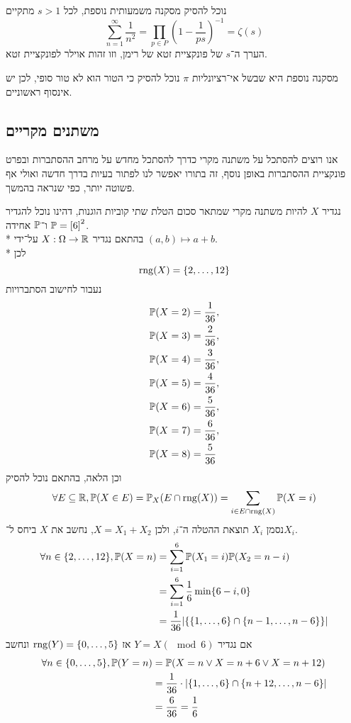 \begin{conclusion}
	נוכל להסיק מסקנה משמעותית נוספת, לכל $s > 1$ מתקיים
	\[
		\sum_{n = 1}^\infty \frac{1}{n^2} = \prod_{p \in P} {(1 - \frac{1}{ps})}^{-1} = \zeta(s)
	\]
	הערך ה־$s$ של פונקציית זטא של רימן, וזו זהות אוילר לפונקציית זטא.
\end{conclusion}
\begin{conclusion}
	מסקנה נוספת היא שבשל אי־רציונליות $\pi$ נוכל להסיק כי הטור הוא לא טור סופי, לכן יש אינסוף ראשוניים.
\end{conclusion}

\subsection{משתנים מקריים}
אנו רוצים להסתכל על משתנה מקרי כדרך להסתכל מחדש על מרחב ההסתברות ובפרט פונקציית ההסתברות באופן נוסף, זה בתורו יאפשר לנו לפתור בעיות בדרך חדשה ואולי אף פשוטה יותר, כפי שנראה בהמשך.
\begin{example}
	נגדיר $X$ להיות משתנה מקרי שמתאר סכום הטלת שתי קוביות הוגנות, דהינו נוכל להגדיר $\mathbb{P} = {[6]}^2$ ו־$\mathbb{P}$ אחידה. \\*
	בהתאם נגדיר $X : \Omega \to \mathbb{R}$ על־ידי $(a, b) \mapsto a + b$. \\*
	לכן
	\[
		\operatorname{rng}(X) = \{2, \dots, 12 \}
	\]
	נעבור לחישוב הסתברויות
	\begin{align*}
		& \mathbb{P}(X = 2) = \frac{1}{36}, \\
		& \mathbb{P}(X = 3) = \frac{2}{36}, \\
		& \mathbb{P}(X = 4) = \frac{3}{36}, \\
		& \mathbb{P}(X = 5) = \frac{4}{36}, \\
		& \mathbb{P}(X = 6) = \frac{5}{36}, \\
		& \mathbb{P}(X = 7) = \frac{6}{36}, \\
		& \mathbb{P}(X = 8) = \frac{5}{36}
	\end{align*}
	וכן הלאה, בהתאם נוכל להסיק
	\[
		\forall E \subseteq \mathbb{R},
		\mathbb{P}(X \in E)
		= \mathbb{P}_X(E \cap \operatorname{rng}(X))
		= \sum_{i \in E \cap \operatorname{rng}(X)} \mathbb{P}(X = i)
	\]
	נסמן $X_i$ תוצאת ההטלה ה־$i$, ולכן $X = X_1 + X_2$, נחשב את $X$ ביחס ל־$X_i$.
	\begin{align*}
		\forall n \in \{2, \dots, 12\},
		\mathbb{P}(X = n) 
		& = \sum_{i = 1}^{6} \mathbb{P}(X_1 = i) \mathbb{P}(X_2 = n - i) \\
		& = \sum_{i = 1}^{6} \frac{1}{6} \min\{6 - i, 0\} \\
		& = \frac{1}{36} |\{\{1, \dots, 6\} \cap \{n - 1, \dots, n - 6 \}\}|
	\end{align*}
	אם נגדיר $Y = X (\mod 6)$ אז $\operatorname{rng}(Y) = \{0, \dots, 5\}$ ונחשב
	\begin{align*}
		\forall n \in \{0, \dots, 5\},
		\mathbb{P}(Y = n)
		& = \mathbb{P}(X = n \lor X = n + 6 \lor X = n + 12) \\
		& = \frac{1}{36} \cdot |\{1, \dots, 6\} \cap \{n + 12, \dots, n - 6\}| \\
		& = \frac{6}{36} = \frac{1}{6}
	\end{align*}
\end{example}

